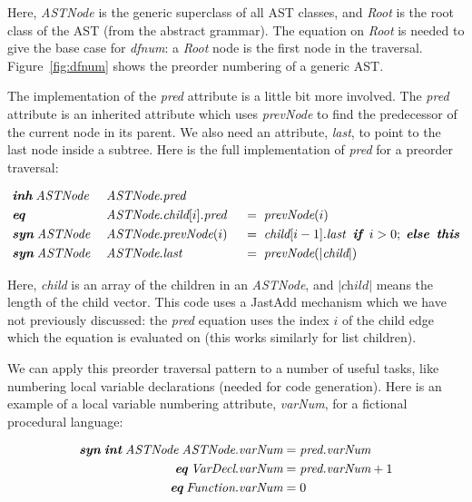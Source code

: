 \documentclass[10pt, twoside, openright]{book}
\newcommand{\figref}[1]{Figure~\ref{#1}}
\begin{document}
\noindent
Here, \emph{ASTNode} is the generic superclass of all AST classes, and \emph{Root} is the
root class of the AST (from the abstract grammar). The equation on \emph{Root} is needed
to give the base case for \emph{dfnum}: a \emph{Root} node is the first node in the traversal.
\figref{fig:dfnum} shows the preorder numbering
of a generic AST.

\goodbreak
The implementation of the \emph{pred} attribute is a little bit more involved.
The \emph{pred} attribute is an inherited attribute which uses \emph{prevNode} to
find the predecessor of the current node in its parent.
We also need an attribute, \emph{last}, to point to the last node inside
a subtree. Here is the full implementation of \emph{pred}
for a preorder traversal:

\begin{alignat*}{3}
& \textit{\textbf{inh}} \; \textit{ASTNode} & \; \textit{ASTNode}&.\textit{pred} && \\
& \textit{\textbf{eq}} \; & \; \textit{ASTNode}&.\textit{child}[i].\textit{pred} \; &&= \; \textit{prevNode}(i) \\
& \textit{\textbf{syn}} \; \textit{ASTNode} & \; \textit{ASTNode}&.\textit{prevNode}(i)
  \; &&= \; \textit{child}[i-1].\textit{last} \;\; \textit{\textbf{if}} \;\; i > 0; \; \textit{\textbf{else}} \;\; \textit{\textbf{this}} \\
& \textit{\textbf{syn}} \; \textit{ASTNode} & \; \textit{ASTNode}&.\textit{last} \; &&= \; \textit{prevNode}(|\textit{child}|)
\end{alignat*}

\noindent
Here, \emph{child} is
an array of the children in an \emph{ASTNode}, and $|\textit{child}|$ means the length
of the child vector. This code uses a JastAdd mechanism which we have not previously discussed:
the \emph{pred} equation uses the index $i$ of the child edge which the equation is evaluated on
(this works similarly for list children).


We can apply this preorder traversal pattern to a number of useful tasks, like
numbering local variable declarations (needed for code generation).
Here is an example of a local variable numbering attribute, \emph{varNum}, for
a fictional procedural language:

\begin{align*}
\textit{\textbf{syn}} \; \textit{\textbf{int}} \; \textit{ASTNode} \; \textit{ASTNode}.&\textit{varNum} =
  \textit{pred.varNum} \\
\textit{\textbf{eq}} \; \textit{VarDecl}.&\textit{varNum} = \textit{pred.varNum} + 1 \\
\textit{\textbf{eq}} \; \textit{Function}.&\textit{varNum} = 0
\end{align*}
\end{document}
